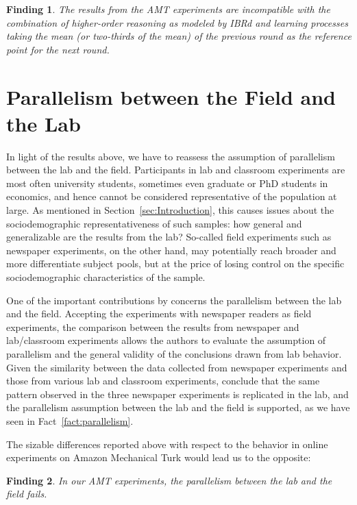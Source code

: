 \documentclass[12pt,review]{elsarticle}
\newtheorem{fdn}{Finding}
\begin{document}
\begin{fdn}
The results from the AMT experiments are incompatible with the combination of higher-order reasoning as modeled by IBRd and learning processes taking the mean (or two-thirds of the mean) of the previous round as the reference point for the next round. 
\end{fdn}

\section{Parallelism between the Field and the Lab\label{sec:Parallelism}}
\noindent
In light of the results above, we have to reassess the assumption
of parallelism between the lab and the field. Participants in lab
and classroom experiments are most often university students, sometimes
even graduate or PhD students in economics, and hence cannot be considered
representative of the population at large. As mentioned in Section~\ref{sec:Introduction},
this causes issues about the sociodemographic representativeness of
such samples: how general and generalizable are the results from the
lab? So-called field experiments such as newspaper experiments, on
the other hand, may potentially reach broader and more differentiate
subject pools, but at the price of losing control on the specific
sociodemographic characteristics of the sample.

One of the important contributions by \citet{NagelEtAl02} concerns
the parallelism between the lab and the field. Accepting the experiments
with newspaper readers as field experiments, the comparison between
the results from newspaper and lab/classroom experiments allows the
authors to evaluate the assumption of parallelism and the general
validity of the conclusions drawn from lab behavior. Given the similarity
between the data collected from newspaper experiments and those from
various lab and classroom experiments, \cite{NagelEtAl02} conclude
that the same pattern observed in the three newspaper experiments
is replicated in the lab, and the parallelism assumption between the
lab and the field is supported, as we have seen in Fact~\ref{fact:parallelism}.

The sizable differences reported above with respect to the behavior
in online experiments on Amazon Mechanical Turk would lead us to the
opposite: 

\begin{fdn}
In our AMT experiments, the parallelism between the lab and the field fails.
\end{fdn}
\end{document}
